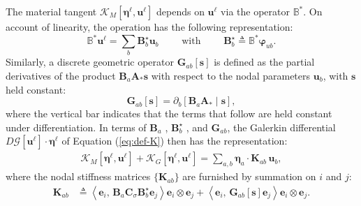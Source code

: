 The material tangent \(\mathcal{K}_M\left[\bm{\eta}^\ell, \bm{u}^\ell\right]\)
depends on \(\bm{u}^\ell\) %
{via} the operator \(\mathbb{B}^*\).
{On account of linearity}, %
{the operation has} %
the following representation:
\begin{equation}
\mathbb{B}^*_{} \bm{u}^\ell = \sum_b \bm{B}^\star_{b} {\bm{u}}_b
\qquad\text{ with }\qquad
\bm{B}^\star_b \triangleq \mathbb{B}^*\bm{\varphi}_{u b}.
\label{eq:def-Bb}
\end{equation} 
Similarly, %
a discrete geometric operator \(\bm{G}_{ab}[\bm{s}]\)
is defined
as the partial derivatives of the product \(\bm{B}_a\bm{A}_*\bm{s}\)
with respect to the nodal parameters \(\bm{u}_b\),
with \(\bm{s}\) held constant:
%
\begin{equation}
\bm{G}_{ab}[\bm{s}] = \partial_b[\bm{B}_a\bm{A}_*\mid\bm{s}],
\label{eq:def-Gab}
\end{equation}
where the vertical bar indicates that the terms that follow are held constant under differentiation.
%
In terms of \(\bm{B}_a\)%
,     \(\bm{B}^\star_b\)%
, and \(\bm{G}_{ab}\),   %
the Galerkin 
differential \(D\mathcal{G}\left[\bm{u}^\ell\right]\cdot\bm{\eta}^\ell\) of Equation (\ref{eq:def-K}) then has the representation:
\begin{equation} 
\begin{aligned}
\mathcal{K}_M\left[\bm{\eta}^\ell, \bm{u}^\ell\right] + \mathcal{K}_G\left[\bm{\eta}^\ell, \bm{u}^\ell\right] = \sum_{a,b} \bm{\eta}_a\cdot\mathbf{K}_{ab} \, \bm{u}_b,
\end{aligned}
\end{equation}
where the nodal stiffness matrices \(\{\mathbf{K}_{a b}\}\)
are furnished by summation on \(i\) and \(j\):
\begin{equation}
\begin{aligned}
\mathbf{K}_{ab} 
  &\triangleq 
  \left<\mathbf{e}_i ,\,\bm{B}^{}_a \bm{C}_{\sigma}\bm{B}^{\star}_b \mathbf{e}_j\right> \mathbf{e}_i\otimes\mathbf{e}_j
  +\left<\mathbf{e}_i ,\, \bm{G}_{ab}[\bm{s}]\mathbf{e}_j\right> \mathbf{e}_i\otimes\mathbf{e}_j .
\end{aligned}
\label{eq:def-kab}
\end{equation}


